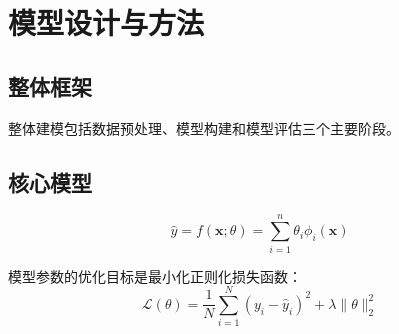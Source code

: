 \section{模型设计与方法}


\subsection{整体框架}
整体建模包括数据预处理、模型构建和模型评估三个主要阶段。

\subsection{核心模型}
\begin{equation}
\hat{y} = f(\mathbf{x}; \theta) = \sum_{i=1}^{n} \theta_i \phi_i(\mathbf{x})
\end{equation}

模型参数的优化目标是最小化正则化损失函数：
\begin{equation}
\mathcal{L}(\theta) = \frac{1}{N}\sum_{i=1}^{N} (y_i - \hat{y}_i)^2 + \lambda \|\theta\|_2^2
\end{equation}
